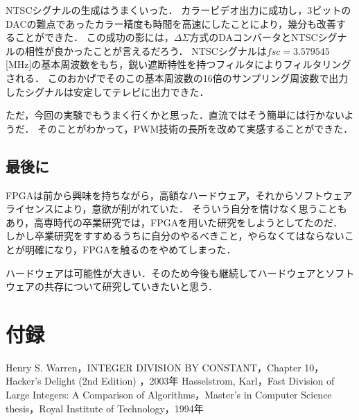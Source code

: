 NTSCシグナルの生成はうまくいった．
カラービデオ出力に成功し，3ビットのDACの難点であったカラー精度も時間を高速にしたことにより，幾分も改善することができた．
この成功の影には，$\Delta\Sigma$方式のDAコンバータとNTSCシグナルの相性が良かったことが言えるだろう．
NTSCシグナルは$fsc=3.579545$[MHz]の基本周波数をもち，鋭い遮断特性を持つフィルタによりフィルタリングされる．
このおかげでそのこの基本周波数の16倍のサンプリング周波数で出力したシグナルは安定してテレビに出力できた．

ただ，今回の実験でもうまく行くかと思った．直流ではそう簡単には行かないようだ．
そのことがわかって，PWM技術の長所を改めて実感することができた．

\subsection{最後に}
FPGAは前から興味を持ちながら，高額なハードウェア，それからソフトウェアライセンスにより，意欲が削がれていた．
そういう自分を情けなく思うこともあり，高専時代の卒業研究では，FPGAを用いた研究をしようとしてたのだ．
しかし卒業研究をすすめるうちに自分のやるべきこと，やらなくてはならないことが明確になり，FPGAを触るのをやめてしまった．

ハードウェアは可能性が大きい．そのため今後も継続してハードウェアとソフトウェアの共存について研究していきたいと思う．

\clearpage
\section{付録}












\begin{thebibliography}{9}
 Henry S. Warren，INTEGER DIVISION BY CONSTANT，Chapter 10，Hacker's Delight (2nd Edition) ，2003年
 Hasselstrom, Karl，Fast Division of Large Integers: A Comparison of Algorithms，Master's in Computer Science thesis，Royal Institute of Technology，1994年
\end{thebibliography}
